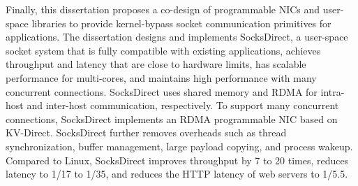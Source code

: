 \begin{enabstract}
Finally, this dissertation proposes a co-design of programmable NICs and user-space libraries to provide kernel-bypass socket communication primitives for applications. The dissertation designs and implements SocksDirect, a user-space socket system that is fully compatible with existing applications, achieves throughput and latency that are close to hardware limits, has scalable performance for multi-cores, and maintains high performance with many concurrent connections. SocksDirect uses shared memory and RDMA for intra-host and inter-host communication, respectively. To support many concurrent connections, SocksDirect implements an RDMA programmable NIC based on KV-Direct. SocksDirect further removes overheads such as thread synchronization, buffer management, large payload copying, and process wakeup. Compared to Linux, SocksDirect improves throughput by 7 to 20 times, reduces latency to 1/17 to 1/35, and reduces the HTTP latency of web servers to 1/5.5.

\end{enabstract}
